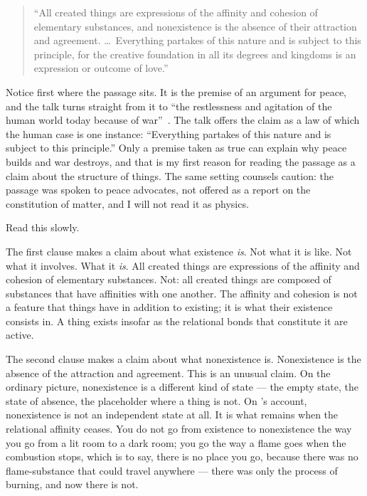 \begin{quote}
``All created things are expressions of the affinity and cohesion of
elementary substances, and nonexistence is the absence of their
attraction and agreement. \ldots\ Everything partakes of this nature and is
subject to this principle, for the creative foundation in all its
degrees and kingdoms is an expression or outcome of love.''
\citep[Talk 48]{PUP}
\end{quote}

Notice first where the passage sits.
It is the premise of an argument for peace, and the talk turns straight from
it to ``the restlessness and agitation of the human world today because of
war''~\citep[Talk~48]{PUP}.
The talk offers the claim as a law of which the human case is one instance:
``Everything partakes of this nature and is subject to this principle.''
Only a premise taken as true can explain why peace builds and war destroys,
and that is my first reason for reading the passage as a claim about the
structure of things.
The same setting counsels caution: the passage was spoken to peace advocates,
not offered as a report on the constitution of matter, and I will not read it
as physics.

Read this slowly.

The first clause makes a claim about what existence \emph{is}.
Not what it is like.
Not what it involves.
What it \emph{is}.
All created things are expressions of the affinity and cohesion of elementary
substances.
Not: all created things are composed of substances that have affinities with
one another.
The affinity and cohesion is not a feature that things have in addition to
existing; it is what their existence consists in.
A thing exists insofar as the relational bonds that constitute it are active.

The second clause makes a claim about what nonexistence is.
Nonexistence is the absence of the attraction and agreement.
This is an unusual claim.
On the ordinary picture, nonexistence is a different kind of state --- the
empty state, the state of absence, the placeholder where a thing is not.
On \AbdulBaha's account, nonexistence is not an independent state at all.
It is what remains when the relational affinity ceases.
You do not go from existence to nonexistence the way you go from a lit room
to a dark room; you go the way a flame goes when the combustion stops, which
is to say, there is no place you go, because there was no flame-substance
that could travel anywhere --- there was only the process of burning, and
now there is not.

